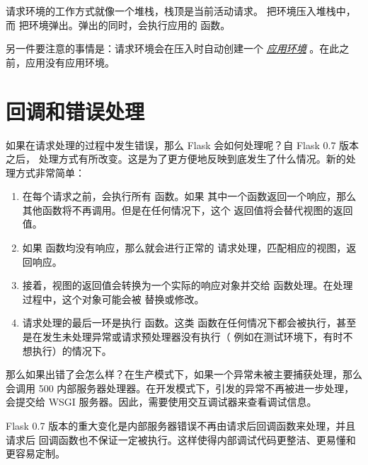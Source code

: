 \documentclass[a4paper,12pt]{sphinxmanual}
\begin{document}
请求环境的工作方式就像一个堆栈，栈顶是当前活动请求。
{\hyperref[api:flask.ctx.RequestContext.push]{}} 把环境压入堆栈中，而
{\hyperref[api:flask.ctx.RequestContext.pop]{}} 把环境弹出。弹出的同时，会执行应用的
{\hyperref[api:flask.Flask.teardown_request]{}} 函数。

另一件要注意的事情是：请求环境会在压入时自动创建一个
{\hyperref[appcontext:app-context]{\emph{应用环境}}} 。在此之前，应用没有应用环境。


\section{回调和错误处理}
\label{reqcontext:callbacks-and-errors}\label{reqcontext:id4}
如果在请求处理的过程中发生错误，那么 Flask 会如何处理呢？自 Flask 0.7 版本之后，
处理方式有所改变。这是为了更方便地反映到底发生了什么情况。新的处理方式非常简单：
\begin{enumerate}
\item {} 
在每个请求之前，会执行所有 {\hyperref[api:flask.Flask.before_request]{}} 函数。如果
其中一个函数返回一个响应，那么其他函数将不再调用。但是在任何情况下，这个
返回值将会替代视图的返回值。

\item {} 
如果 {\hyperref[api:flask.Flask.before_request]{}} 函数均没有响应，那么就会进行正常的
请求处理，匹配相应的视图，返回响应。

\item {} 
接着，视图的返回值会转换为一个实际的响应对象并交给
{\hyperref[api:flask.Flask.after_request]{}} 函数处理。在处理过程中，这个对象可能会被
替换或修改。

\item {} 
请求处理的最后一环是执行 {\hyperref[api:flask.Flask.teardown_request]{}} 函数。这类
函数在任何情况下都会被执行，甚至是在发生未处理异常或请求预处理器没有执行（
例如在测试环境下，有时不想执行）的情况下。

\end{enumerate}

那么如果出错了会怎么样？在生产模式下，如果一个异常未被主要捕获处理，那么会调用
500 内部服务器处理器。在开发模式下，引发的异常不再被进一步处理，会提交给 WSGI
服务器。因此，需要使用交互调试器来查看调试信息。

Flask 0.7 版本的重大变化是内部服务器错误不再由请求后回调函数来处理，并且请求后
回调函数也不保证一定被执行。这样使得内部调试代码更整洁、更易懂和更容易定制。
\end{document}
